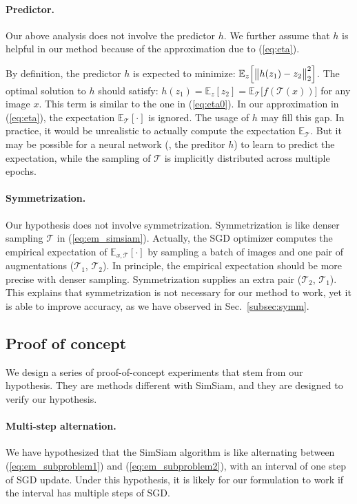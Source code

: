 \documentclass[final]{cvpr}
\begin{document}
\paragraph{Predictor.}
Our above analysis does not involve the predictor $h$. We further assume that $h$ is helpful in our method because of the approximation due to (\ref{eq:eta}).

By definition, the predictor $h$ is expected to minimize:
$
\mathbb{E}_z
\Big[
	\big\|
	h({z}_1)
	-
	z_2
	\big\|^2_2
\Big]
$.
The optimal solution to $h$ should satisfy:
$
h(z_1)\!=\!\mathbb{E}_z
[
	z_2
]
\!=\!
\mathbb{E}_{\mathcal{T}}
\big[
	f(\mathcal{T}(x))
\big]
$ for any image $x$.
This term is similar to the one in (\ref{eq:eta0}).
In our approximation in (\ref{eq:eta}),
the expectation $\mathbb{E}_{\mathcal{T}}[\cdot]$ is ignored. The usage of $h$ may fill this gap.
In practice, it would be unrealistic to actually compute the expectation $\mathbb{E}_{\mathcal{T}}$. But it may be possible for a neural network (\eg, the preditor $h$) to learn to predict the expectation, while the sampling of $\mathcal{T}$ is implicitly distributed across multiple epochs. 

\paragraph{Symmetrization.} Our hypothesis does not involve symmetrization. Symmetrization is like denser sampling $\mathcal{T}$ in (\ref{eq:em_simsiam}). Actually, the SGD optimizer computes the empirical expectation of $\mathbb{E}_{x, \mathcal{T}}[\cdot]$ by sampling a batch of images and one pair of augmentations ($\mathcal{T}_1$, $\mathcal{T}_2$). In principle, the empirical expectation should be more precise with denser sampling. Symmetrization supplies an extra pair ($\mathcal{T}_2$, $\mathcal{T}_1$).
This explains that symmetrization is not necessary for our method to work, yet it is able to improve accuracy, as we have observed in Sec.~\ref{subsec:symm}.

\subsection{Proof of concept} \label{subsec:poc}

We design a series of proof-of-concept experiments that stem from our hypothesis. They are methods different with SimSiam, and they are designed to verify our hypothesis.

\paragraph{Multi-step alternation.}
We have hypothesized that the 
SimSiam algorithm is like alternating between (\ref{eq:em_subproblem1}) and (\ref{eq:em_subproblem2}), with an interval of one step of SGD update. Under this hypothesis, it is likely for our formulation to work if the interval has multiple steps of SGD. 
\end{document}
